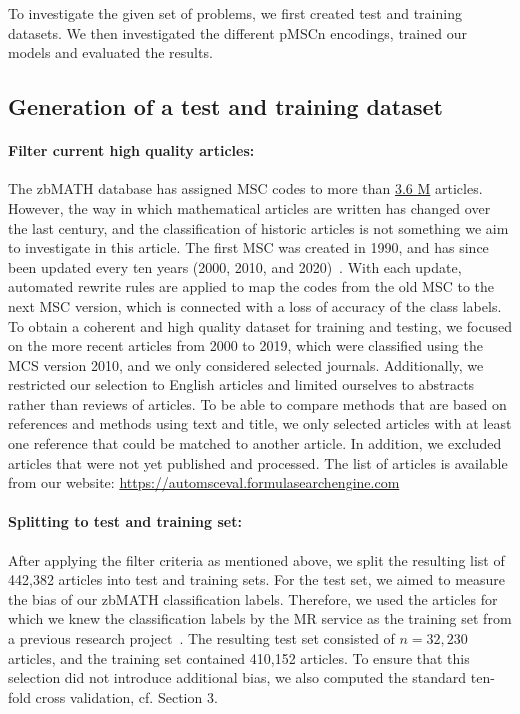 To investigate the given set of problems, we first created test and training datasets.
We then investigated the different pMSCn encodings, trained our models and evaluated the results.

\subsection{Generation of a test and training dataset}
\paragraph{Filter current high quality articles:}
The zbMATH database has assigned MSC codes to more than \href{https://zbmath.org/?q=cc\%3A*}{3.6 M} articles.
However, the way in which mathematical articles are written has changed over the last century, and the classification of historic articles is not something we aim to investigate in this article. The first MSC was created in 1990, and has since been updated every ten years (2000, 2010, and 2020)~\cite{MSC2010}.
With each update, automated rewrite rules are applied to map the codes from the old MSC to the next MSC version, which is connected with a loss of accuracy of the class labels.
To obtain a coherent and high quality dataset for training and testing, we focused on the more recent articles from 2000 to 2019, which were classified using the MCS version 2010, and we only considered selected journals.
Additionally, we restricted our selection to English articles and limited ourselves to abstracts rather than reviews of articles.
To be able to compare methods that are based on references and methods using text and title, we only selected articles with at least one reference that could be matched to another article.
In addition, we excluded articles that were not yet published and processed.
The list of articles is available from our website: \url{https://automsceval.formulasearchengine.com}
\paragraph{Splitting to test and training set:}
After applying the filter criteria as mentioned above, we split the resulting list of 442,382 articles into test and training sets.
For the test set, we aimed to measure the bias of our zbMATH classification labels.
Therefore, we used the articles for which we knew the classification labels by the MR service as the training set from a previous research project~\cite{Bannister2018}.
The resulting test set consisted of \(n = 32,230\) articles, and the training set contained 410,152 articles.
To ensure that this selection did not introduce additional bias, we also computed the standard ten-fold cross validation, cf. Section 3.
